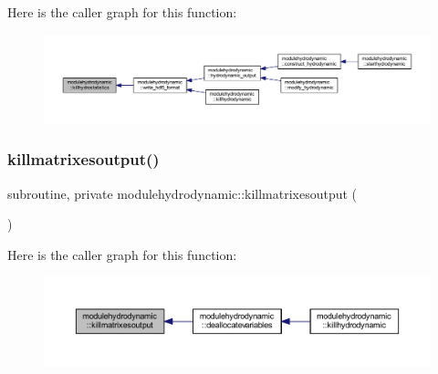 Here is the caller graph for this function\+:\nopagebreak
\begin{figure}[H]
\begin{center}
\leavevmode
\includegraphics[width=350pt]{namespacemodulehydrodynamic_a4ef7d15d1c97d54f708e71f1262485b0_icgraph}
\end{center}
\end{figure}
\mbox{\label{namespacemodulehydrodynamic_a8a24bb3b15a1b676c23a6ecd0a1defa8}} 
\subsubsection{\texorpdfstring{killmatrixesoutput()}{killmatrixesoutput()}}
{\footnotesize\ttfamily subroutine, private modulehydrodynamic\+::killmatrixesoutput (\begin{DoxyParamCaption}{ }\end{DoxyParamCaption})\hspace{0.3cm}{\ttfamily [private]}}

Here is the caller graph for this function\+:\nopagebreak
\begin{figure}[H]
\begin{center}
\leavevmode
\includegraphics[width=350pt]{namespacemodulehydrodynamic_a8a24bb3b15a1b676c23a6ecd0a1defa8_icgraph}
\end{center}
\end{figure}
\mbox{\label{namespacemodulehydrodynamic_a9b2046e58cfbfc36752c1c596ac76085}} 
